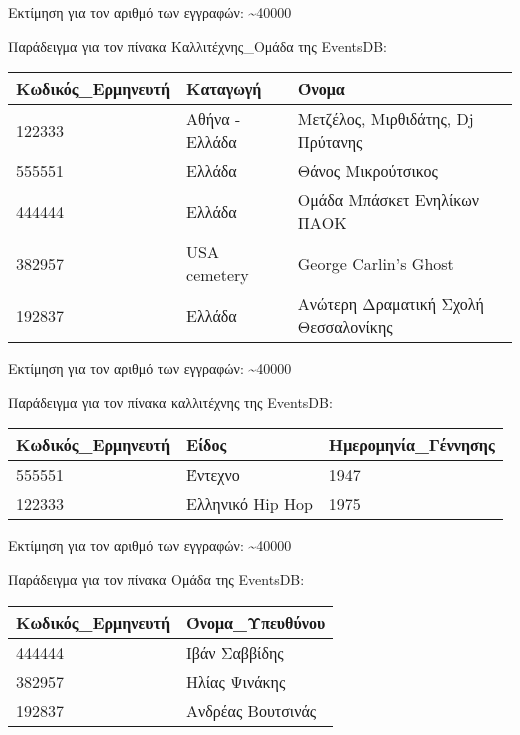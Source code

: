 Εκτίμηση για τον αριθμό των εγγραφών: \textasciitilde 40000

Παράδειγμα για τον πίνακα Καλλιτέχνης\_Ομάδα της EventsDB:

\begin{table}[H]
  \centering
  \footnotesize
  \begin{tabular}{|l|l|l|}
  \hline
  Κωδικός\_Ερμηνευτή & Καταγωγή & Όνομα \\ \hline
  122333 & Αθήνα - Ελλάδα & Μετζέλος, Μιρθιδάτης, Dj Πρύτανης \\ \hline
  555551 & Ελλάδα & Θάνος Μικρούτσικος \\ \hline
  444444 & Ελλάδα & Ομάδα Μπάσκετ Ενηλίκων ΠΑΟΚ \\ \hline
  382957 & USA cemetery & George Carlin's Ghost  \\ \hline
  192837 & Ελλάδα & Ανώτερη Δραματική Σχολή Θεσσαλονίκης \\ \hline
\end{tabular}
\end{table}
  
Εκτίμηση για τον αριθμό των εγγραφών: \textasciitilde 40000

Παράδειγμα για τον πίνακα καλλιτέχνης της EventsDB:

\begin{table}[H]
  \centering
  \footnotesize
  \begin{tabular}{|l|l|l|}
  \hline
  Κωδικός\_Ερμηνευτή & Είδος & Ημερομηνία\_Γέννησης \\ \hline
  555551 & Έντεχνο & 1947 \\ \hline
  122333 & Ελληνικό Hip Hop & 1975 \\ \hline
\end{tabular}
\end{table}
  
Εκτίμηση για τον αριθμό των εγγραφών: \textasciitilde 40000

Παράδειγμα για τον πίνακα Ομάδα της EventsDB:

\begin{table}[H]
  \centering
  \footnotesize
  \begin{tabular}{|l|l|}
  \hline
  Κωδικός\_Ερμηνευτή & Όνομα\_Υπευθύνου \\ \hline
  444444 & Ιβάν Σαββίδης \\ \hline
  382957 & Ηλίας Ψινάκης \\ \hline
  192837 & Ανδρέας Βουτσινάς \\ \hline
\end{tabular}
\end{table}
  
